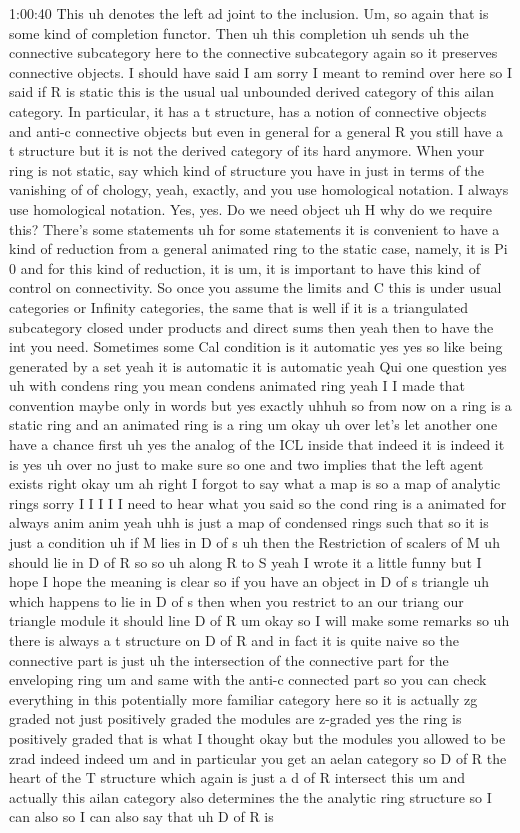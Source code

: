 \begin{unfinished}{1:00:40}
This uh denotes the left ad joint to the inclusion. Um, so again that is  some kind of completion functor. Then uh this completion uh sends uh the connective subcategory here to the connective subcategory again so it preserves connective objects. I should have said I am sorry I meant to remind over here so I said if R is static this is the usual ual unbounded derived category of this ailan category. In particular, it has a t structure, has a notion of connective objects and anti-c connective objects but even in general for a general R you still have a t structure but it is not the derived category of its hard anymore. When your ring is not static, say which kind of structure you have in just in terms of the vanishing of of chology, yeah, exactly, and you use homological notation. I always use homological notation. Yes, yes. Do we need object uh H why do we require this? There's some statements uh for some statements it is convenient to have a kind of reduction from a general animated ring to the static case, namely, it is Pi 0 and for this kind of reduction, it is um, it is important to have this kind of control on connectivity. So once you assume the limits and C this is under usual categories or Infinity categories, the same that is well if it is a triangulated subcategory closed under products and direct sums then yeah then to have the int you need. Sometimes some Cal condition is it automatic yes yes so like being generated by a set yeah it is automatic it is automatic yeah Qui one question yes uh with condens ring you mean condens animated ring yeah I I made that convention maybe only in words but yes exactly uhhuh so from now on a ring is a static ring and an animated ring is a ring um okay uh over let's let another one have a chance first uh yes the analog of the ICL inside that indeed it is indeed it is yes uh over no just to make sure so one and two implies that the left agent exists right okay um ah right I forgot to say what a map is so a map of analytic rings sorry I I I I I need to hear what you said so the cond ring is a animated for always anim anim yeah uhh is just a map of condensed rings such that so it is just a condition uh if M lies in D of s uh then the Restriction of scalers of M uh should lie in D of R so so uh along R to S yeah I wrote it a little funny but I hope I hope the meaning is clear so if you have an object in D of s triangle uh which happens to lie in D of s then when you restrict to an our triang our triangle module it should line D of R um okay so I will make some remarks so uh there is always a t structure on D of R and in fact it is quite naive so the connective part is just uh the intersection of the connective part for the enveloping ring um and same with the anti-c connected part so you can check everything in this potentially more familiar category here so it is actually zg graded not just positively graded the modules are z-graded yes the ring is positively graded that is  what I thought okay but the modules you allowed to be zrad indeed indeed um and in particular you get an aelan category so D of R the heart of the T structure which again is just a d of R intersect this um and actually this ailan category also determines the the analytic ring structure so I can also so I can also say that uh D of R is 
\end{unfinished}
